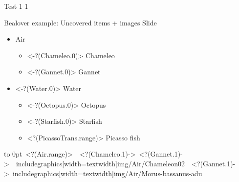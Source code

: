 \documentclass{beamer}
\begin{document}
\begin{frame}
{Test}
{1}
1
\end{frame}
\begin{frame}
{Bealover example: Uncovered items + images}
{Slide \insertslidenumber}
\begin{itemize}
\item
Air
\begin{itemize}
\item
\only<-?(Chameleo.0)>{ \color{red}}
Chameleo
\item
\only<-?(Gannet.0)>{ \color{red}}
Gannet
\end{itemize}
\item
\only<-?(Water.0)>{ \color{red}}
Water
\begin{itemize}
\item
\only<-?(Octopus.0)>{ \color{red}}
Octopus
\item
\only<-?(Starfish.0)>{ \color{red}}
Starfish
\item
\only<?(PicassoTrans.range)>{ \color{red}}
Picasso fish
\end{itemize}
\end{itemize}
\vbox to 0pt{\hbox{%
\only<?(Air.range)> {%
      \visible<?(Chameleo.1)->{%
        \only<?(Gannet.1)->{ \color{red}}
        includegraphics[width=textwidth]{img/Air/Chameleon02}%
      }%
      \visible<?(Gannet.1)->{%
        includegraphics[width=textwidth]{img/Air/Morus-bassanus-adu}%
      }%
}
}}%
\end{frame}
\end{document}
